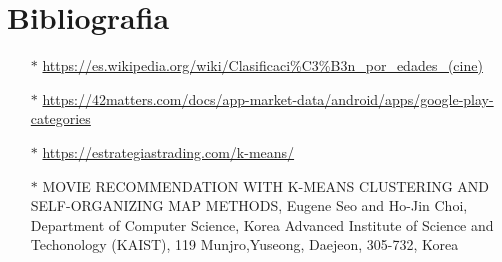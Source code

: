 \documentclass[10pt, a4paper]{article}
\begin{document}
\section{Bibliografia}
\begin{enumerate}
\item[$\ast$]\url{https://es.wikipedia.org/wiki/Clasificaci%C3%B3n_por_edades_(cine)}
\item[$\ast$]\url{https://42matters.com/docs/app-market-data/android/apps/google-play-categories}
\item[$\ast$]\url{https://estrategiastrading.com/k-means/}
\item[$\ast$]MOVIE RECOMMENDATION WITH K-MEANS CLUSTERING AND SELF-ORGANIZING MAP METHODS, Eugene Seo and Ho-Jin Choi, Department of Computer Science, Korea Advanced Institute of Science and Techonology (KAIST), 119 Munjro,Yuseong, Daejeon, 305-732, Korea
\end{enumerate}
\end{document}
